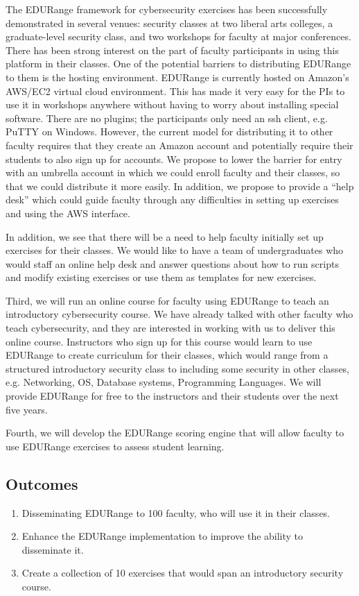 The EDURange framework for cybersecurity exercises has been successfully demonstrated 
in several venues: security classes at two liberal arts colleges, a graduate-level security class, and
two workshops for faculty at major conferences.  There has been strong interest on the part of
faculty participants in using this platform in their classes.  
One of the potential barriers to distributing EDURange to them is the hosting environment.
EDURange is currently hosted on
Amazon's AWS/EC2 virtual cloud environment.  This has made it very easy for the PIs to use it in 
workshops anywhere without having to worry about installing special software.  There are no plugins;
the participants only need an ssh client, e.g. PuTTY on Windows.  However, the current 
model for distributing
it to other faculty requires that they create an Amazon account and potentially require their students
to also sign up for accounts.  We propose to lower the barrier for entry with an umbrella account in 
which we could enroll faculty and their classes, so that we could distribute it more easily.  In addition,
we propose to provide a ``help desk'' which could guide faculty through any difficulties in setting up 
exercises and using the AWS interface.

In addition, we see that there will be a need to help faculty initially set up exercises 
for their classes.  We
would like to have a team of undergraduates who would staff an online help desk
and answer questions about how to run scripts and modify existing exercises or use them as 
templates for new exercises.

Third, we will run an online course for faculty using EDURange to teach an introductory cybersecurity
course.  We have already talked with other faculty who teach cybersecurity, and they are interested in 
working with us to deliver this online course.  Instructors who sign up for this course would learn
to use EDURange to create curriculum for their classes, which would range from a structured introductory
security class to including some 
security in other classes, e.g. Networking, OS, Database systems, Programming Languages.
We will provide EDURange for free to the instructors and their students over the next five years.

Fourth, we will develop the EDURange scoring engine that will allow faculty to use EDURange exercises
to assess student learning.


\subsection{Outcomes}
\begin{enumerate}
\item Disseminating EDURange to 100 faculty, who will use it in their classes.
\item Enhance the EDURange implementation to improve the ability to disseminate it.
\item Create a collection of 10 exercises that would span an introductory security course.
\end{enumerate}

